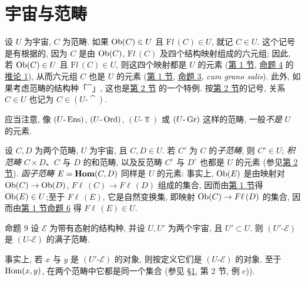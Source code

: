 \section{宇宙与范畴}%
\hypertarget{sga4.exp.I.appendix.II.sec.3}{}

设 $U$ 为宇宙, $C$ 为范畴. 如果 $\operatorname{Ob}(C)\in U$ 且 $%
\mathrm{F}{}l\,(C)\in U$, 就记 $C\in U$. 这个记号是有根据的, 因为 $C$ 是由 $\operatorname{Ob}(C)$, $\mathrm{F}{}l\,(C)$ 及四个结构映射组成的六元组; 因此, 若 $\operatorname{Ob}(C)\in U$ 且 $\mathrm{F}{}l\,(C)\in U$, 则这四个映射都是 $U$ 的元素 (\hyperlink{sga4.exp.I.appendix.II.sec.1}{第 1 节}, \hyperlink{sga4.exp.I.appendix.II.sec.1.proposition.4}{命题 4} 的\hyperlink{sga4.exp.I.appendix.II.sec.1.corollary.to.proposition.4.1}{推论 1}), 从而六元组 $C$ 也是 $U$ 的元素 (\hyperlink{sga4.exp.I.appendix.II.sec.1}{第 1 节}, \hyperlink{sga4.exp.I.appendix.II.sec.1.proposition.3}{命题 3}, \textit{cum grano salis}). 此外, 如果考虑范畴的结构种「$\cat$」, 这也是\hyperlink{sga4.exp.I.appendix.II.sec.2}{第 2 节} 的一个特例. 按\hyperlink{sga4.exp.I.appendix.II.sec.2}{第 2 节}的记号, 关系 $C\in U$ 也记为 $C\in(U\text{-}\cat)$.

应当注意, 像 $(U\text{-}\operatorname{Ens})$, $(U\text{-}\operatorname{Ord})$, $(U\text{-}\Top)$ 或 $(U\text{-}\operatorname{Gr})$ 这样的范畴, 一般\emph{不是} $U$ 的元素.

设 $C,D$ 为两个范畴, $U$ 为宇宙, 且 $C,D\in U$. 若 $C'$ 为 $C$ 的\emph{子范畴}, 则 $C'\in U$; \emph{积范畴} $C\times D$、$C$ 与 $D$ 的和范畴, 以及反范畴 $C^\circ$ 与 $D^\circ$ 也都是 $U$ 的元素 (参见\hyperlink{sga4.exp.I.appendix.II.sec.2}{第 2 节}). \emph{函子范畴} $E=\operatorname{\mathbf{Hom}}(C,D)$ 同样是 $U$ 的元素: 事实上, $\operatorname{Ob}(E)$ 是由映射对 $\operatorname{Ob}(C)\rightarrow\operatorname{Ob}(D)$, $F\ell\,(C)\rightarrow F\ell\,(D)$ 组成的集合, 因而由\hyperlink{sga4.exp.I.appendix.II.sec.1}{第 1 节}得 $\operatorname{Ob}(E)\in U$;\pageoriginale 至于 $F\ell\,(E)$, 它是自然变换集, 即映射 $\operatorname{Ob}(C)\rightarrow F\ell\,(D)$ 的集合, 因而由\hyperlink{sga4.exp.I.appendix.II.sec.1}{第 1 节}\hyperlink{sga4.exp.I.appendix.II.sec.1.proposition.6}{命题 6} 得 $F\ell\,(E)\in U$.

\hypertarget{sga4.exp.I.appendix.II.sec.3.proposition.9}{}
\begin{enonce*}{命题 9}
设 $\mathcal{E}$ 为带有态射的结构种, 并设 $U,U'$ 为两个宇宙, 且 $U'\subset U$. 则 $(U'\text{-}\mathcal{E})$ 是 $(U\text{-}\mathcal{E})$ 的满子范畴.
\end{enonce*}

事实上, 若 $x$ 与 $y$ 是 $(U'\text{-}\mathcal{E})$ 的对象, 则按定义它们是 $(U\text{-}\mathcal{E})$ 的对象. 至于 $\operatorname{Hom}(x,y)$, 在两个范畴中它都是同一个集合 (参见 \hyperlink{sga4.exp.I.appendix.II.sec.1}{\S 1}, 第 2 节, 例 c)).

